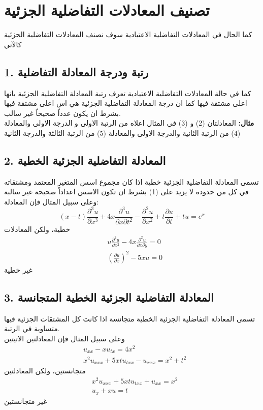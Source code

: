 \section[تصنيف المعادلات التفاضلية الجزئية]{تصنيف المعادلات التفاضلية الجزئية\cite{pde1}}
كما الحال في المعادلات التفاضلية الاعتيادية سوف نصنف المعادلات التفاضلية الجزئية كالآتي

\subsection*{1. رتبة ودرجة المعادلة التفاضلية}
كما في حالة المعادلات التفاضلية الاعتيادية تعرف رتبة المعادلة التفاضلية الجزئية بانها اعلى مشتقة فيها كما ان درجة المعادلة التفاضلية الجزئية هي اس اعلى مشتقة فيها بشرط ان يكون عدداً صحيحاً غير سالب.\\ [5pt]
\textbf{مثال:} المعادلتان (2) و (3) في المثال اعلاه من الرتبة الاولى و الدرجة الاولى والمعادلة (4) من الرتبة الثانية والدرجة الاولى والمعادلة (5) من الرتبة الثالثة والدرجة الثانية

\subsection*{2. المعادلة التفاضلية الجزئية الخطية}
تسمى المعادلة التفاضلية الجزئية خطية اذا كان مجموع اسس المتغير المعتمد ومشتقاته في كل من حدوده لا يزيد على (1) بشرط ان تكون الاسس اعداداً صحيحة غير سالبة وعلى سبيل المثال فإن المعادلة:
\begin{equation*}
	(x-t) \frac{\partial^3 u}{\partial x^3} + 4x \frac{\partial^3 u}{\partial x\partial t^2} - \frac{\partial ^2 u}{\partial x^2} + t \frac{\partial u}{\partial t} + tu = e^x
\end{equation*}
خطية، ولكن المعادلات
\begin{align*}
	& u \frac{\partial^2  u}{\partial x^2} - 4x \frac{\partial^2 u}{\partial x\partial y} = 0\\[5pt]
	&\left(\frac{\partial u}{\partial x}\right)^2 - 5xu = 0
\end{align*}
غير خطية

\subsection*{3. المعادلة التفاضلية الجزئية الخطية المتجانسة}
تسمى المعادلة التفاضلية الجزئية الخطية متجانسة اذا كانت كل المشتقات الجزئية فيها متساوية في الرتبة.\\
وعلى سبيل المثال فإن المعادلتين الاتيتين
\begin{align*}
&u_{xx} - x u_{tx} = 4x^2\\
&x^2 u_{xxx} + 5xt u_{txx} - u_{xxx} = x^2 + t^2
\end{align*}
متجانستين، ولكن المعادلتين
\begin{align*}
	&x^2 u_{xxx} + 5xt u_{txx} + u_{xx} = x^2\\
	&u_x + xu = t
\end{align*}
غير متجانستين

